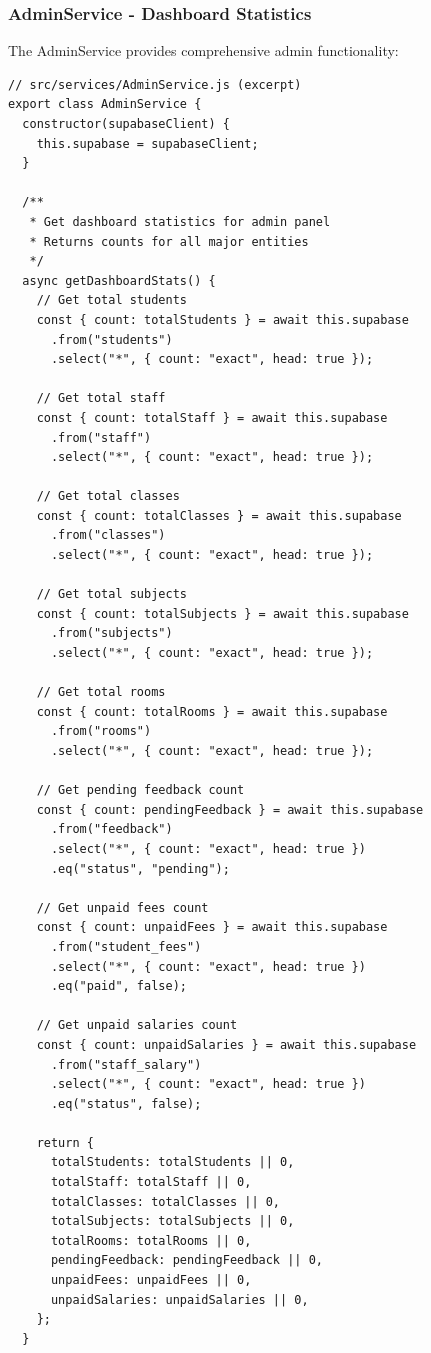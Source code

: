 \documentclass[12pt,a4paper]{article}
\begin{document}
\subsubsection{AdminService - Dashboard Statistics}

The AdminService provides comprehensive admin functionality:

\begin{verbatim}
// src/services/AdminService.js (excerpt)
export class AdminService {
  constructor(supabaseClient) {
    this.supabase = supabaseClient;
  }

  /**
   * Get dashboard statistics for admin panel
   * Returns counts for all major entities
   */
  async getDashboardStats() {
    // Get total students
    const { count: totalStudents } = await this.supabase
      .from("students")
      .select("*", { count: "exact", head: true });

    // Get total staff
    const { count: totalStaff } = await this.supabase
      .from("staff")
      .select("*", { count: "exact", head: true });

    // Get total classes
    const { count: totalClasses } = await this.supabase
      .from("classes")
      .select("*", { count: "exact", head: true });

    // Get total subjects
    const { count: totalSubjects } = await this.supabase
      .from("subjects")
      .select("*", { count: "exact", head: true });

    // Get total rooms
    const { count: totalRooms } = await this.supabase
      .from("rooms")
      .select("*", { count: "exact", head: true });

    // Get pending feedback count
    const { count: pendingFeedback } = await this.supabase
      .from("feedback")
      .select("*", { count: "exact", head: true })
      .eq("status", "pending");

    // Get unpaid fees count
    const { count: unpaidFees } = await this.supabase
      .from("student_fees")
      .select("*", { count: "exact", head: true })
      .eq("paid", false);

    // Get unpaid salaries count
    const { count: unpaidSalaries } = await this.supabase
      .from("staff_salary")
      .select("*", { count: "exact", head: true })
      .eq("status", false);

    return {
      totalStudents: totalStudents || 0,
      totalStaff: totalStaff || 0,
      totalClasses: totalClasses || 0,
      totalSubjects: totalSubjects || 0,
      totalRooms: totalRooms || 0,
      pendingFeedback: pendingFeedback || 0,
      unpaidFees: unpaidFees || 0,
      unpaidSalaries: unpaidSalaries || 0,
    };
  }


\end{verbatim}
\end{document}
